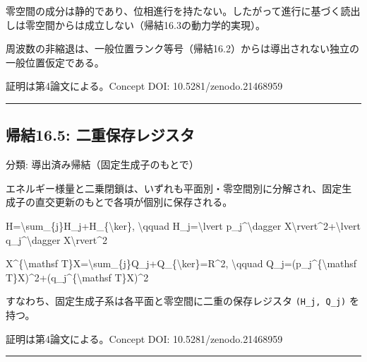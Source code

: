 \documentclass[
  a4paper,
]{ltjsarticle}
\newenvironment{Shaded}{}{}
\newcommand{\NormalTok}[1]{#1}
\begin{document}
零空間の成分は静的であり、位相進行を持たない。したがって進行に基づく読出しは零空間からは成立しない（帰結16.3の動力学的実現）。

周波数の非縮退は、一般位置ランク等号（帰結16.2）からは導出されない独立の一般位置仮定である。

証明は第4論文による。Concept DOI: 10.5281/zenodo.21468959

\begin{center}\rule{0.5\linewidth}{0.5pt}\end{center}

\subsection{帰結16.5:
二重保存レジスタ}\label{ux5e30ux7d5016.5-ux4e8cux91cdux4fddux5b58ux30ecux30b8ux30b9ux30bf}

分類: 導出済み帰結（固定生成子のもとで）

エネルギー様量と二乗閉鎖は、いずれも平面別・零空間別に分解され、固定生成子の直交更新のもとで各項が個別に保存される。

\begin{Shaded}
\begin{Highlighting}[]
\NormalTok{H=\textbackslash{}sum\_\{j\}H\_j+H\_\{\textbackslash{}ker\},}
\NormalTok{\textbackslash{}qquad}
\NormalTok{H\_j=\textbackslash{}lvert p\_j\^{}\textbackslash{}dagger X\textbackslash{}rvert\^{}2+\textbackslash{}lvert q\_j\^{}\textbackslash{}dagger X\textbackslash{}rvert\^{}2}
\end{Highlighting}
\end{Shaded}

\begin{Shaded}
\begin{Highlighting}[]
\NormalTok{X\^{}\{\textbackslash{}mathsf T\}X=\textbackslash{}sum\_\{j\}Q\_j+Q\_\{\textbackslash{}ker\}=R\^{}2,}
\NormalTok{\textbackslash{}qquad}
\NormalTok{Q\_j=(p\_j\^{}\{\textbackslash{}mathsf T\}X)\^{}2+(q\_j\^{}\{\textbackslash{}mathsf T\}X)\^{}2}
\end{Highlighting}
\end{Shaded}

すなわち、固定生成子系は各平面と零空間に二重の保存レジスタ
\texttt{(H\_j,\ Q\_j)} を持つ。

証明は第4論文による。Concept DOI: 10.5281/zenodo.21468959

\begin{center}\rule{0.5\linewidth}{0.5pt}\end{center}
\end{document}
